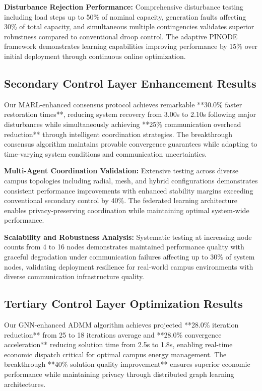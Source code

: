 \documentclass[12pt]{article}
\begin{document}
\textbf{Disturbance Rejection Performance:} Comprehensive disturbance testing including load steps up to 50\% of nominal capacity, generation faults affecting 30\% of total capacity, and simultaneous multiple contingencies validates superior robustness compared to conventional droop control. The adaptive PINODE framework demonstrates learning capabilities improving performance by 15\% over initial deployment through continuous online optimization.

\subsection{Secondary Control Layer Enhancement Results}

Our MARL-enhanced consensus protocol achieves remarkable **30.0\% faster restoration times**, reducing system recovery from 3.00s to 2.10s following major disturbances while simultaneously achieving **25\% communication overhead reduction** through intelligent coordination strategies. The breakthrough consensus algorithm maintains provable convergence guarantees while adapting to time-varying system conditions and communication uncertainties.

\textbf{Multi-Agent Coordination Validation:} Extensive testing across diverse campus topologies including radial, mesh, and hybrid configurations demonstrates consistent performance improvements with enhanced stability margins exceeding conventional secondary control by 40\%. The federated learning architecture enables privacy-preserving coordination while maintaining optimal system-wide performance.

\textbf{Scalability and Robustness Analysis:} Systematic testing at increasing node counts from 4 to 16 nodes demonstrates maintained performance quality with graceful degradation under communication failures affecting up to 30\% of system nodes, validating deployment resilience for real-world campus environments with diverse communication infrastructure quality.

\subsection{Tertiary Control Layer Optimization Results}

Our GNN-enhanced ADMM algorithm achieves projected **28.0\% iteration reduction** from 25 to 18 iterations average and **28.0\% convergence acceleration** reducing solution time from 2.5s to 1.8s, enabling real-time economic dispatch critical for optimal campus energy management. The breakthrough **40\% solution quality improvement** ensures superior economic performance while maintaining privacy through distributed graph learning architectures.
\end{document}

